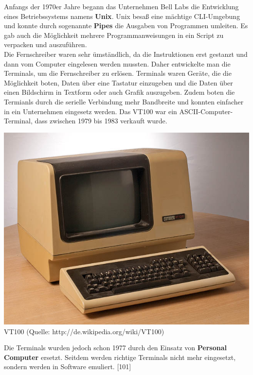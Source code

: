 \documentclass[12pt,a4paper]{report}
\begin{document}
\begin{onehalfspace}
Anfangs der 1970er Jahre begann das Unternehmen Bell Labs die Entwicklung eines Betriebssystems namens \textbf{Unix}. Unix besaß eine mächtige CLI-Umgebung und konnte durch sogenannte \textbf{Pipes} die Ausgaben von Programmen umleiten. Es gab auch die Möglichkeit mehrere Programmanweisungen in ein Script zu verpacken und auszuführen. \\

Die Fernschreiber waren sehr ümständlich, da die Instruktionen erst gestanzt und dann vom Computer eingelesen werden mussten. Daher entwickelte man die Terminals, um die Fernschreiber zu erlösen. Terminals waren Geräte, die die Möglichkeit boten, Daten über eine Tastatur einzugeben und die Daten über einen Bildschirm in Textform oder auch Grafik auszugeben. Zudem boten die Termianls durch die serielle Verbindung mehr Bandbreite und konnten einfacher in ein Unternehmen eingesetz werden. Das VT100 war ein ASCII-Computer-Terminal, dass zwischen 1979 bis 1983 verkauft wurde.\\

\begin{center}
\includegraphics[scale=2.0]{img/vt100.jpg}\\
VT100 (Quelle: http://de.wikipedia.org/wiki/VT100)
\end{center}

Die Terminals wurden jedoch schon 1977 durch den Einsatz von \textbf{Personal Computer} ersetzt. Seitdem werden richtige Terminals nicht mehr eingesetzt, sondern werden in Software emuliert. [101]\\


\end{onehalfspace}
\end{document}
